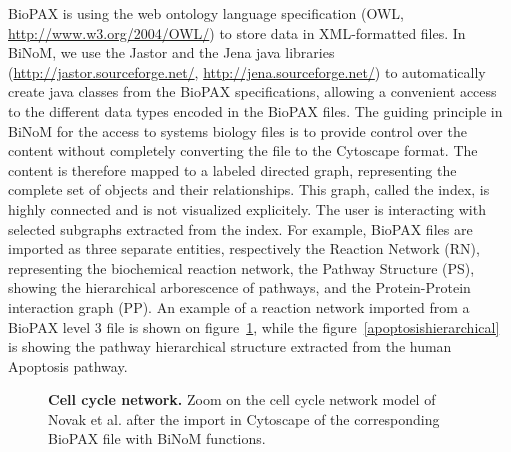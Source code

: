 \documentclass[10pt]{bmc_article}
\newenvironment{bmcformat}{\baselineskip20pt\sloppy\setboolean{publ}{false}}{\baselineskip20pt\sloppy}
\begin{document}
\begin{bmcformat}
BioPAX is using the web ontology language specification (OWL,
\url{http://www.w3.org/2004/OWL/}) to store data in XML-formatted files. In
BiNoM, we use the Jastor and the Jena java libraries
(\url{http://jastor.sourceforge.net/}, \url{http://jena.sourceforge.net/}) to
automatically create java classes from the BioPAX specifications, allowing a
convenient access to the different data types encoded in the BioPAX files. The
guiding principle in BiNoM for the
access to systems biology files is to provide control over the content without
completely converting the file to the Cytoscape format. The content is therefore
mapped to a labeled directed graph, representing the complete set of objects and
their relationships. This graph, called the index, is highly connected and is
not visualized explicitely. The user is interacting with selected subgraphs
extracted from the index. For example, BioPAX files are imported as three
separate entities, respectively the Reaction Network (RN), representing the
biochemical reaction network, the Pathway Structure (PS), showing the
hierarchical arborescence of pathways, and the Protein-Protein interaction graph
(PP). An example of a reaction network imported from a BioPAX level 3 file is
shown on figure~\ref{mphasebiopax}, while the figure~\ref{apoptosishierarchical} is showing the pathway hierarchical
structure extracted from the human Apoptosis pathway.  


\begin{figure}[h]
 \caption{\label{mphasebiopax}  \textbf{Cell cycle network.} Zoom on the cell
cycle network model of Novak et al. \cite{novak1998model} after the import in 
Cytoscape of the corresponding BioPAX file with BiNoM functions.}
\end{figure}


\end{bmcformat}
\end{document}
